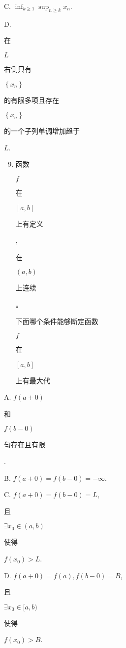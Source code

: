 \documentclass[10pt]{article}
\begin{document}
C. $\inf _{k \geqslant 1} \sup _{n \geqslant k} x_{n}$.

D. \begin{CJK}{UTF8}{mj}在\end{CJK} $L$ \begin{CJK}{UTF8}{mj}右侧只有\end{CJK} $\left\{x_{n}\right\}$ \begin{CJK}{UTF8}{mj}的有限多项且存在\end{CJK} $\left\{x_{n}\right\}$ \begin{CJK}{UTF8}{mj}的一个子列单调增加趋于\end{CJK} $L$.

\begin{enumerate}
  \setcounter{enumi}{8}
  \item \begin{CJK}{UTF8}{mj}函数\end{CJK} $f$ \begin{CJK}{UTF8}{mj}在\end{CJK} $[a, b]$ \begin{CJK}{UTF8}{mj}上有定义\end{CJK}, \begin{CJK}{UTF8}{mj}在\end{CJK} $(a, b)$ \begin{CJK}{UTF8}{mj}上连续\end{CJK}。\begin{CJK}{UTF8}{mj}下面哪个条件能够断定函数\end{CJK} $f$ \begin{CJK}{UTF8}{mj}在\end{CJK} $[a, b]$ \begin{CJK}{UTF8}{mj}上有最大代\end{CJK}
\end{enumerate}
A. $f(a+0)$ \begin{CJK}{UTF8}{mj}和\end{CJK} $f(b-0)$ \begin{CJK}{UTF8}{mj}匀存在且有限\end{CJK}.

B. $f(a+0)=f(b-0)=-\infty$.

C. $f(a+0)=f(b-0)=L$, \begin{CJK}{UTF8}{mj}且\end{CJK} $\exists x_{0} \in(a, b)$ \begin{CJK}{UTF8}{mj}使得\end{CJK} $f\left(x_{0}\right)>L$.

D. $f(a+0)=f(a), f(b-0)=B$, \begin{CJK}{UTF8}{mj}且\end{CJK} $\exists x_{0} \in[a, b)$ \begin{CJK}{UTF8}{mj}使得\end{CJK} $f\left(x_{0}\right)>B$.
\end{document}
